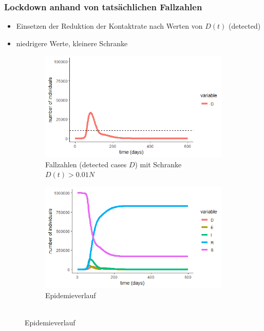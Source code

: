 \documentclass{beamer}
\begin{document}
\begin{frame}
	\frametitle{Lockdown anhand von tatsächlichen Fallzahlen}
	\begin{itemize}
		\item Einsetzen der Reduktion der Kontaktrate nach Werten von $D(t)$ (detected)
		\item niedrigere Werte, kleinere Schranke		
	\end{itemize}
	\begin{figure}
        \centering
        \begin{subfigure}[b]{0.495\textwidth}
            \centering
            \includegraphics[width=\textwidth]{thres-E}
		\caption{Fallzahlen (detected cases $D$) mit Schranke $D(t) > 0.01N$}
        \end{subfigure}
        \hfill
        \begin{subfigure}[b]{0.495\textwidth}  
            \centering 
            \includegraphics[width=\textwidth]{thres-E-epi}
		\caption{Epidemieverlauf \\ \ }
        \end{subfigure}
	\end{figure}

	
\end{frame}
\end{document}
